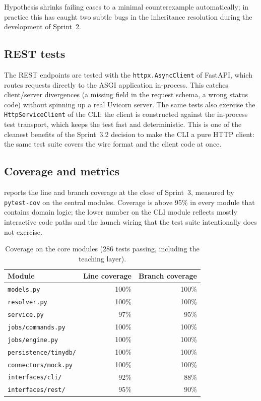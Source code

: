 Hypothesis shrinks failing cases to a minimal counterexample
automatically; in practice this has caught two subtle bugs in
the inheritance resolution during the development of Sprint~2.

\subsection{REST tests}

The REST endpoints are tested with the \texttt{httpx.AsyncClient}
of FastAPI, which routes requests directly to the ASGI application
in-process. This catches client/server divergences (a missing field
in the request schema, a wrong status code) without spinning up a
real Uvicorn server. The same tests also exercise the
\texttt{HttpServiceClient} of the CLI: the client is constructed
against the in-process test transport, which keeps the test fast
and deterministic. This is one of the cleanest benefits of the
Sprint~3.2 decision to make the CLI a pure HTTP client: the same
test suite covers the wire format and the client code at once.

\subsection{Coverage and metrics}

 reports the line and branch coverage at the
close of Sprint~3, measured by \texttt{pytest-cov} on the central
modules. Coverage is above 95\% in every module that contains
domain logic; the lower number on the CLI module reflects mostly
interactive code paths and the launch wiring that the test suite
intentionally does not exercise.

\begin{table}[ht]
  \centering
  \small
  \begin{tabular}{l r r}
    \toprule
    \textbf{Module} & \textbf{Line coverage} & \textbf{Branch coverage} \\
    \midrule
    \texttt{models.py}            & 100\% & 100\% \\
    \texttt{resolver.py}          & 100\% & 100\% \\
    \texttt{service.py}           & 97\%  & 95\% \\
    \texttt{jobs/commands.py}     & 100\% & 100\% \\
    \texttt{jobs/engine.py}       & 100\% & 100\% \\
    \texttt{persistence/tinydb/}  & 100\% & 100\% \\
    \texttt{connectors/mock.py}   & 100\% & 100\% \\
    \texttt{interfaces/cli/}      & 92\%  & 88\% \\
    \texttt{interfaces/rest/}     & 95\%  & 90\% \\
    \bottomrule
  \end{tabular}
  \caption{Coverage on the core modules (286 tests passing, including
    the teaching layer).}
  \label{tab:coverage}
\end{table}

